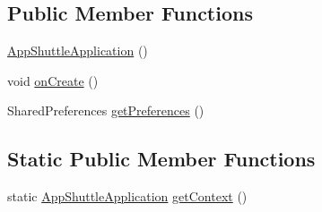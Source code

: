 \subsection*{\-Public \-Member \-Functions}
\begin{DoxyCompactItemize}
\item 
\hyperlink{classlab_1_1davidahn_1_1appshuttle_1_1_app_shuttle_application_a23024e1f4e6a9b50c262fb19a1a09d69}{\-App\-Shuttle\-Application} ()
\item 
void \hyperlink{classlab_1_1davidahn_1_1appshuttle_1_1_app_shuttle_application_a3bc4890f9565e18edaad0a0bb06e8b2f}{on\-Create} ()
\item 
\-Shared\-Preferences \hyperlink{classlab_1_1davidahn_1_1appshuttle_1_1_app_shuttle_application_ae46ed63b120534585fb15e7d5ed5593a}{get\-Preferences} ()
\end{DoxyCompactItemize}
\subsection*{\-Static \-Public \-Member \-Functions}
\begin{DoxyCompactItemize}
\item 
static \hyperlink{classlab_1_1davidahn_1_1appshuttle_1_1_app_shuttle_application}{\-App\-Shuttle\-Application} \hyperlink{classlab_1_1davidahn_1_1appshuttle_1_1_app_shuttle_application_a3aaf27429843b2eb05fdd33f20be8f86}{get\-Context} ()
\end{DoxyCompactItemize}
